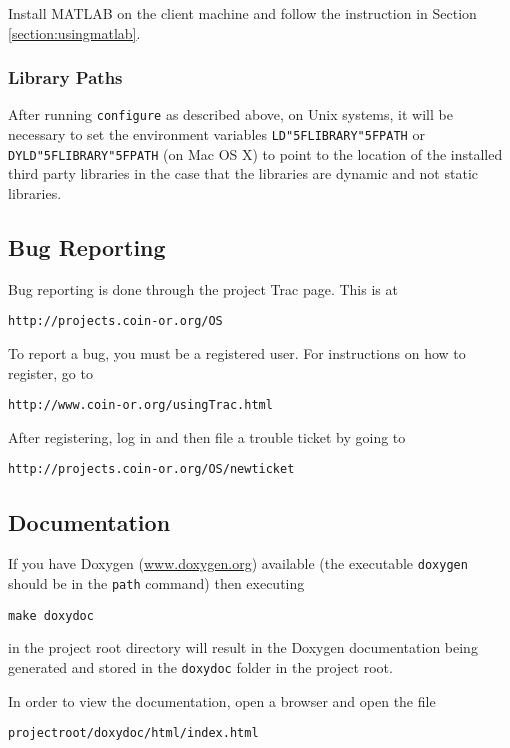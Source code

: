 \documentclass[11pt]{article}
\renewcommand{\_}{{\char"5F}}
\renewcommand{\{}{{\char"7B}}
\renewcommand{\}}{{\char"7D}}
\renewcommand{\^}{{\char"0D}}
\renewcommand{\'}{{\char"0D}}
\begin{document}
Install MATLAB on the client machine and follow the instruction in Section
 \ref{section:usingmatlab}.

\subsubsection{Library Paths}

After running {\tt configure} as described above,  on Unix systems, it will be necessary to set the environment variables {\tt LD\_LIBRARY\_PATH} or {\tt DYLD\_LIBRARY\_PATH} (on Mac OS X) to point to the location of the installed third party libraries in the case that the libraries are dynamic and not static libraries.


\subsection{Bug Reporting}

Bug reporting is done through the project Trac page. This is at
\begin{verbatim}
http://projects.coin-or.org/OS
\end{verbatim}
To report a bug, you must be a registered user.  For  instructions on  how to register, go to
\begin{verbatim}
http://www.coin-or.org/usingTrac.html
\end{verbatim}
After registering, log in and then file a trouble ticket by going to
\begin{verbatim}
http://projects.coin-or.org/OS/newticket
\end{verbatim}


\subsection{Documentation}\label{section:documentation}

If you have Doxygen  (\url{www.doxygen.org}) available (the executable {\tt doxygen} should be in the {\tt path} command) then executing
\begin{verbatim}
make doxydoc
\end{verbatim}
in the project root directory will result in the Doxygen documentation being generated and stored in the {\tt doxydoc} folder in the project root.

In order to view the documentation, open a browser and open the file
\begin{verbatim}
projectroot/doxydoc/html/index.html
\end{verbatim}
\end{document}
